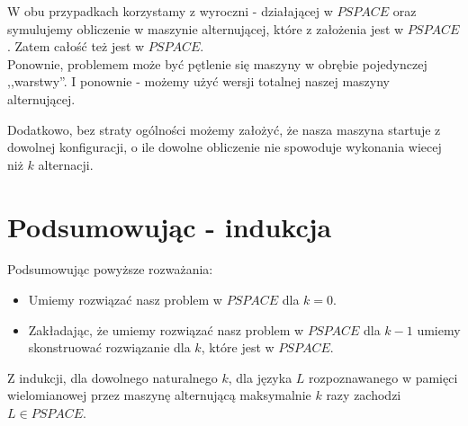 \documentclass[a4paper,11pt]{article}
\begin{document}
W obu przypadkach korzystamy z wyroczni - działającej w $PSPACE$ oraz symulujemy
obliczenie w maszynie alternującej, które z założenia jest w $PSPACE$. Zatem
całość też jest w $PSPACE$.\\


Ponownie, problemem może być pętlenie się maszyny w obrębie pojedynczej
,,warstwy''. I ponownie - możemy użyć wersji totalnej naszej maszyny
alternującej.

Dodatkowo, bez straty ogólności możemy założyć, że nasza maszyna startuje z
dowolnej konfiguracji, o ile dowolne obliczenie nie spowoduje wykonania wiecej
niż $k$ alternacji.



\section*{Podsumowując - indukcja}

Podsumowując powyższe rozważania:
\begin{itemize}
  \item{Umiemy rozwiązać nasz problem w $PSPACE$ dla $k=0$.}
  \item{Zakładając, że umiemy rozwiązać nasz problem w $PSPACE$ dla $k-1$
        umiemy skonstruować rozwiązanie dla $k$, które jest w $PSPACE$.}
\end{itemize}

Z indukcji, dla dowolnego naturalnego $k$, dla języka $L$ rozpoznawanego w
pamięci wielomianowej przez maszynę alternującą maksymalnie $k$ razy
zachodzi $L \in PSPACE$.
\end{document}
